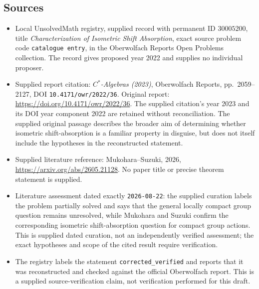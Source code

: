 \documentclass[11pt]{article}
\begin{document}
\subsection{Sources}
\begin{itemize}
\item Local UnsolvedMath registry, supplied record with permanent ID \(30005200\), title \emph{Characterization of Isometric Shift Absorption}, exact source problem code \texttt{catalogue entry}, in the Oberwolfach Reports Open Problems collection. The record gives proposed year 2022 and supplies no individual proposer.
\item Supplied report citation: \emph{\(C^*\)-Algebras (2023)}, Oberwolfach Reports, pp.~2059--2127, DOI \texttt{10.4171/owr/2022/36}. Original report: \url{https://doi.org/10.4171/owr/2022/36}. The supplied citation's year 2023 and its DOI year component 2022 are retained without reconciliation. The supplied original passage describes the broader aim of determining whether isometric shift-absorption is a familiar property in disguise, but does not itself include the hypotheses in the reconstructed statement.
\item Supplied literature reference: Mukohara--Suzuki, 2026, \url{https://arxiv.org/abs/2605.21128}. No paper title or precise theorem statement is supplied.
\item Literature assessment dated exactly \texttt{2026-08-22}: the supplied curation labels the problem partially solved and says that the general locally compact group question remains unresolved, while Mukohara and Suzuki confirm the corresponding isometric shift-absorption question for compact group actions. This is supplied dated curation, not an independently verified assessment; the exact hypotheses and scope of the cited result require verification.
\item The registry labels the statement \texttt{corrected\_verified} and reports that it was reconstructed and checked against the official Oberwolfach report. This is a supplied source-verification claim, not verification performed for this draft.
\end{itemize}
\end{document}
